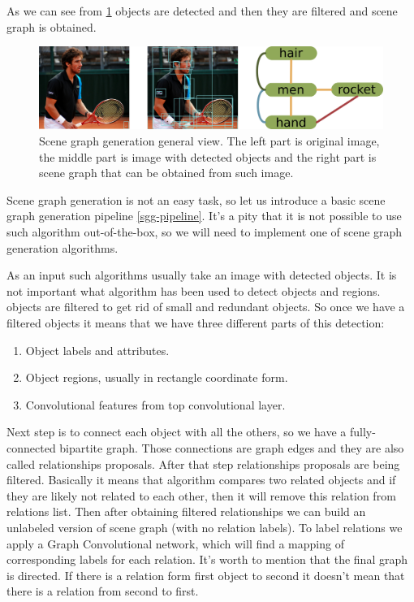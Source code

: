 As we can see from \ref{scene-graph-example} objects are detected and then they are filtered and scene graph is obtained.

\begin{figure}[!h]
    \centering
    \includegraphics[width=\textwidth]{figure/scene-graph-example.png}
    \caption{Scene graph generation general view. The left part is original image, the middle part is image with detected objects and the right part is scene graph that can be obtained from such image.}
    \label{scene-graph-example}
\end{figure}

Scene graph generation is not an easy task, so let us introduce a basic scene graph generation pipeline \ref{sgg-pipeline}. It's a pity that it is not possible to use such algorithm out-of-the-box, so we will need to implement one of scene graph generation algorithms.

As an input such algorithms usually take an image with detected objects. It is not important what algorithm has been used to detect objects and regions. objects are filtered to get rid of small and redundant objects. So once we have a filtered objects it means that we have three different parts of this detection:

\begin{enumerate}
    \item Object labels and attributes.
    \item Object regions, usually in rectangle coordinate form.
    \item Convolutional features from top convolutional layer.
\end{enumerate}

Next step is to connect each object with all the others, so we have a fully-connected bipartite graph. Those connections are graph edges and they are also called relationships proposals. After that step relationships proposals are being filtered. Basically it means that algorithm compares two related objects and if they are likely not related to each other, then it will remove this relation from relations list. Then after obtaining filtered relationships we can build an unlabeled version of scene graph (with no relation labels). To label relations we apply a Graph Convolutional network, which will find a mapping of corresponding labels for each relation. It's worth to mention that the final graph is directed. If there is a relation form first object to second it doesn't mean that there is a relation from second to first.

